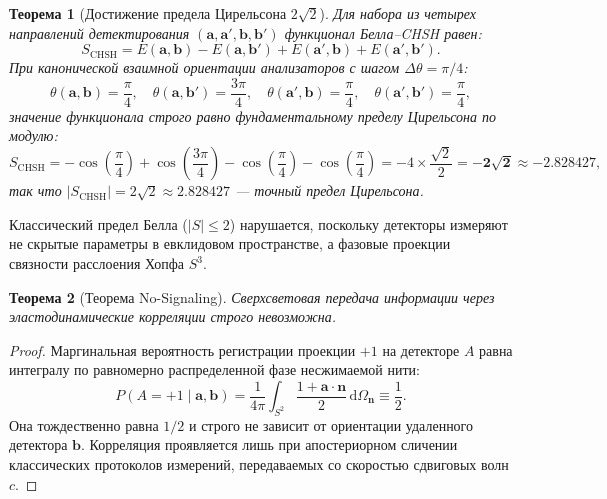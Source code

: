 \documentclass[11pt,a4paper]{article}
\newtheorem{theorem}{Теорема}
\theoremstyle{definition}
\theoremstyle{remark}
\begin{document}
\begin{theorem}[Достижение предела Цирельсона $2\sqrt{2}$]
\label{thm:tsirelson}
Для набора из четырех направлений детектирования $(\mathbf{a}, \mathbf{a}', \mathbf{b}, \mathbf{b}')$ функционал Белла--CHSH равен:
\begin{equation}
    S_{\mathrm{CHSH}} = E(\mathbf{a}, \mathbf{b}) - E(\mathbf{a}, \mathbf{b}') + E(\mathbf{a}', \mathbf{b}) + E(\mathbf{a}', \mathbf{b}').
\end{equation}
При канонической взаимной ориентации анализаторов с шагом $\Delta\theta = \pi/4$:
\begin{equation}
    \theta(\mathbf{a}, \mathbf{b}) = \frac{\pi}{4}, \quad \theta(\mathbf{a}, \mathbf{b}') = \frac{3\pi}{4}, \quad \theta(\mathbf{a}', \mathbf{b}) = \frac{\pi}{4}, \quad \theta(\mathbf{a}', \mathbf{b}') = \frac{\pi}{4},
\end{equation}
значение функционала строго равно фундаментальному пределу Цирельсона по модулю:
\begin{equation}
    S_{\mathrm{CHSH}} = -\cos\left(\frac{\pi}{4}\right) + \cos\left(\frac{3\pi}{4}\right) - \cos\left(\frac{\pi}{4}\right) - \cos\left(\frac{\pi}{4}\right) 
    = -4 \times \frac{\sqrt{2}}{2} = \mathbf{-2\sqrt{2}} \approx -2.828427,
\end{equation}
так что $|S_{\mathrm{CHSH}}| = 2\sqrt{2} \approx 2.828427$ — точный предел Цирельсона.
\end{theorem}
Классический предел Белла ($|S| \le 2$) нарушается, поскольку детекторы измеряют не скрытые параметры в евклидовом пространстве, а фазовые проекции связности расслоения Хопфа $S^3$.

\begin{theorem}[Теорема No-Signaling]
Сверхсветовая передача информации через эластодинамические корреляции строго невозможна.
\end{theorem}
\begin{proof}
Маргинальная вероятность регистрации проекции $+1$ на детекторе $A$ равна интегралу по равномерно распределенной фазе несжимаемой нити:
\begin{equation}
    P(A = +1 \mid \mathbf{a}, \mathbf{b}) = \frac{1}{4\pi} \int_{S^2} \frac{1 + \mathbf{a} \cdot \mathbf{n}}{2} \, \mathrm{d}\Omega_{\mathbf{n}} \equiv \frac{1}{2}.
\end{equation}
Она тождественно равна $1/2$ и строго не зависит от ориентации удаленного детектора $\mathbf{b}$. Корреляция проявляется лишь при апостериорном сличении классических протоколов измерений, передаваемых со скоростью сдвиговых волн $c$.
\end{proof}
\end{document}
